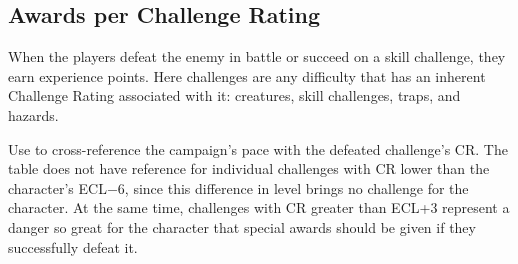 \subsection{Awards per Challenge Rating}
When the players defeat the enemy in battle or succeed on a skill challenge, they earn experience points. Here challenges are any difficulty that has an inherent Challenge Rating associated with it: creatures, skill challenges, traps, and hazards.


Use  to cross-reference the campaign's pace with the defeated challenge's CR. The table does not have reference for individual challenges with CR lower than the character's ECL$-6$, since this difference in level brings no challenge for the character. At the same time, challenges with CR greater than ECL+3 represent a danger so great for the character that special awards should be given if they successfully defeat it.

